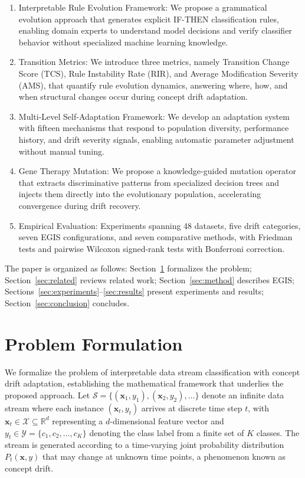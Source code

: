 \documentclass[lettersize,journal]{IEEEtran}
\begin{document}
\begin{enumerate}
    \item Interpretable Rule Evolution Framework: We propose a grammatical evolution approach that generates explicit IF-THEN classification rules, enabling domain experts to understand model decisions and verify classifier behavior without specialized machine learning knowledge.

    \item Transition Metrics: We introduce three metrics, namely Transition Change Score (TCS), Rule Instability Rate (RIR), and Average Modification Severity (AMS), that quantify rule evolution dynamics, answering where, how, and when structural changes occur during concept drift adaptation.

    \item Multi-Level Self-Adaptation Framework: We develop an adaptation system with fifteen mechanisms that respond to population diversity, performance history, and drift severity signals, enabling automatic parameter adjustment without manual tuning.

    \item Gene Therapy Mutation: We propose a knowledge-guided mutation operator that extracts discriminative patterns from specialized decision trees and injects them directly into the evolutionary population, accelerating convergence during drift recovery.

    \item Empirical Evaluation: Experiments spanning 48 datasets, five drift categories, seven EGIS configurations, and seven comparative methods, with Friedman tests and pairwise Wilcoxon signed-rank tests with Bonferroni correction.
\end{enumerate}

The paper is organized as follows: Section~\ref{sec:problem} formalizes the problem; Section~\ref{sec:related} reviews related work; Section~\ref{sec:method} describes EGIS; Sections~\ref{sec:experiments}--\ref{sec:results} present experiments and results; Section~\ref{sec:conclusion} concludes.


\section{Problem Formulation}
\label{sec:problem}

We formalize the problem of interpretable data stream classification with concept drift adaptation, establishing the mathematical framework that underlies the proposed approach. Let $\mathcal{S} = \{(\mathbf{x}_1, y_1), (\mathbf{x}_2, y_2), \ldots\}$ denote an infinite data stream where each instance $(\mathbf{x}_t, y_t)$ arrives at discrete time step $t$, with $\mathbf{x}_t \in \mathcal{X} \subseteq \mathbb{R}^d$ representing a $d$-dimensional feature vector and $y_t \in \mathcal{Y} = \{c_1, c_2, \ldots, c_K\}$ denoting the class label from a finite set of $K$ classes. The stream is generated according to a time-varying joint probability distribution $P_t(\mathbf{x}, y)$ that may change at unknown time points, a phenomenon known as concept drift.
\end{document}
